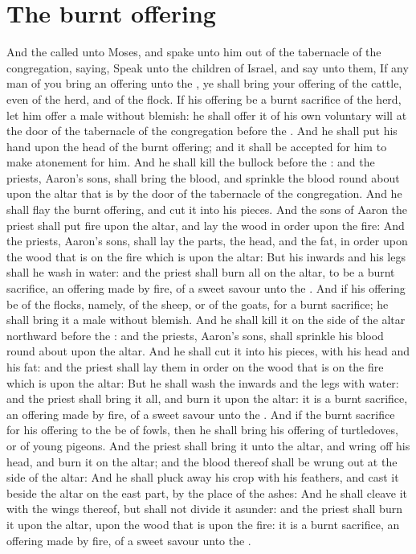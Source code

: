 
\section*{The burnt offering}
\begin{biblechapter} %
\verse And the \LORD called unto Moses, and spake unto him out of the tabernacle of the congregation, saying,
\verse Speak unto the children of Israel, and say unto them, If any man of you bring an offering unto the \LORD, ye shall bring your offering of the cattle, even of the herd, and of the flock.
\verse If his offering be a burnt sacrifice of the herd, let him offer a male without blemish: he shall offer it of his own voluntary will at the door of the tabernacle of the congregation before the \LORD.
\verse And he shall put his hand upon the head of the burnt offering; and it shall be accepted for him to make atonement for him.
\verse And he shall kill the bullock before the \LORD: and the priests, Aaron's sons, shall bring the blood, and sprinkle the blood round about upon the altar that is by the door of the tabernacle of the congregation.
\verse And he shall flay the burnt offering, and cut it into his pieces.
\verse And the sons of Aaron the priest shall put fire upon the altar, and lay the wood in order upon the fire:
\verse And the priests, Aaron's sons, shall lay the parts, the head, and the fat, in order upon the wood that is on the fire which is upon the altar:
\verse But his inwards and his legs shall he wash in water: and the priest shall burn all on the altar, to be a burnt sacrifice, an offering made by fire, of a sweet savour unto the \LORD.
\verse And if his offering be of the flocks, namely, of the sheep, or of the goats, for a burnt sacrifice; he shall bring it a male without blemish.
\verse And he shall kill it on the side of the altar northward before the \LORD: and the priests, Aaron's sons, shall sprinkle his blood round about upon the altar.
\verse And he shall cut it into his pieces, with his head and his fat: and the priest shall lay them in order on the wood that is on the fire which is upon the altar:
\verse But he shall wash the inwards and the legs with water: and the priest shall bring it all, and burn it upon the altar: it is a burnt sacrifice, an offering made by fire, of a sweet savour unto the \LORD.
\verse And if the burnt sacrifice for his offering to the \LORD be of fowls, then he shall bring his offering of turtledoves, or of young pigeons.
\verse And the priest shall bring it unto the altar, and wring off his head, and burn it on the altar; and the blood thereof shall be wrung out at the side of the altar:
\verse And he shall pluck away his crop with his feathers, and cast it beside the altar on the east part, by the place of the ashes:
\verse And he shall cleave it with the wings thereof, but shall not divide it asunder: and the priest shall burn it upon the altar, upon the wood that is upon the fire: it is a burnt sacrifice, an offering made by fire, of a sweet savour unto the \LORD.
\end{biblechapter}

